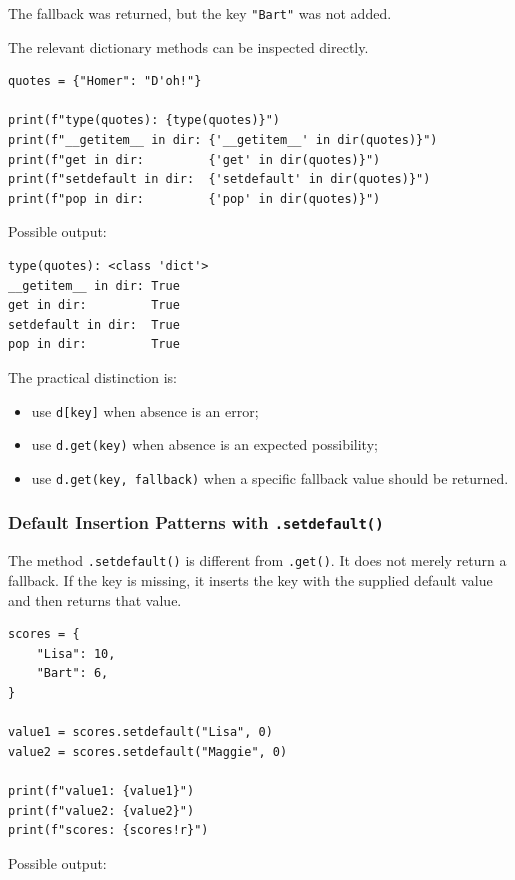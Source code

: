 The fallback was returned, but the key \texttt{"Bart"} was not added.

The relevant dictionary methods can be inspected directly.

\begin{verbatim}
quotes = {"Homer": "D'oh!"}

print(f"type(quotes): {type(quotes)}")
print(f"__getitem__ in dir: {'__getitem__' in dir(quotes)}")
print(f"get in dir:         {'get' in dir(quotes)}")
print(f"setdefault in dir:  {'setdefault' in dir(quotes)}")
print(f"pop in dir:         {'pop' in dir(quotes)}")
\end{verbatim}

Possible output:

\begin{verbatim}
type(quotes): <class 'dict'>
__getitem__ in dir: True
get in dir:         True
setdefault in dir:  True
pop in dir:         True
\end{verbatim}

The practical distinction is:

\begin{itemize}
    \item use \texttt{d[key]} when absence is an error;
    \item use \texttt{d.get(key)} when absence is an expected possibility;
    \item use \texttt{d.get(key, fallback)} when a specific fallback value should be returned.
\end{itemize}

\subsubsection{Default Insertion Patterns with \texttt{.setdefault()}}

The method \texttt{.setdefault()} is different from \texttt{.get()}. It does not merely return a fallback. If the key is missing, it inserts the key with the supplied default value and then returns that value.

\begin{verbatim}
scores = {
    "Lisa": 10,
    "Bart": 6,
}

value1 = scores.setdefault("Lisa", 0)
value2 = scores.setdefault("Maggie", 0)

print(f"value1: {value1}")
print(f"value2: {value2}")
print(f"scores: {scores!r}")
\end{verbatim}

Possible output:

